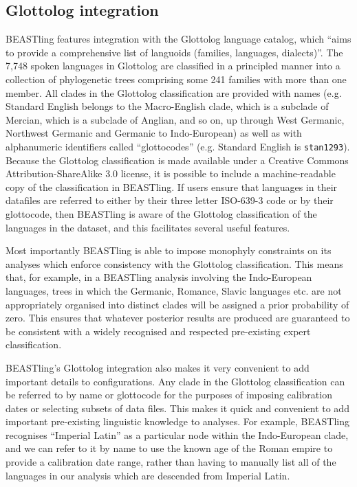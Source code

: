 \documentclass[twocolumn,10pt]{scrartcl}
\begin{document}
\subsection{Glottolog integration}

BEASTling features integration with the Glottolog language catalog\cite{Hammarstroem2016}, which ``aims to provide a comprehensive list of languoids (families, languages, dialects)''.  The 7,748 spoken languages in Glottolog are classified in a principled manner into a collection of phylogenetic trees comprising some 241 families with more than one member.  All clades in the Glottolog classification are provided with names (e.g. Standard English belongs to the Macro-English clade, which is a subclade of Mercian, which is a subclade of Anglian, and so on, up through West Germanic, Northwest Germanic and Germanic to Indo-European) as well as with alphanumeric identifiers called ``glottocodes'' (e.g. Standard English is \texttt{stan1293}).  Because the Glottolog classification is made available under a Creative Commons Attribution-ShareAlike 3.0 license, it is possible to include a machine-readable copy of the classification in BEASTling.  If users ensure that languages in their datafiles are referred to either by their three letter ISO-639-3 code or by their glottocode, then BEASTling is aware of the Glottolog classification of the languages in the dataset, and this facilitates several useful features.

Most importantly BEASTling is able to impose monophyly constraints on its analyses which enforce consistency with the Glottolog classification.  This means that, for example, in a BEASTling analysis involving the Indo-European languages, trees in which the Germanic, Romance, Slavic languages etc. are not appropriately organised into distinct clades will be assigned a prior probability of zero.  This ensures that whatever posterior results are produced are guaranteed to be consistent with a widely recognised and respected pre-existing expert classification.

BEASTling's Glottolog integration also makes it very convenient to add important details to configurations.  Any clade in the Glottolog classification can be referred to by name or glottocode for the purposes of imposing calibration dates or selecting subsets of data files.  This makes it quick and convenient to add important pre-existing linguistic knowledge to analyses.  For example, BEASTling recognises ``Imperial Latin'' as a particular node within the Indo-European clade, and we can refer to it by name to use the known age of the Roman empire to provide a calibration date range, rather than having to manually list all of the languages in our analysis which are descended from Imperial Latin.
\end{document}
